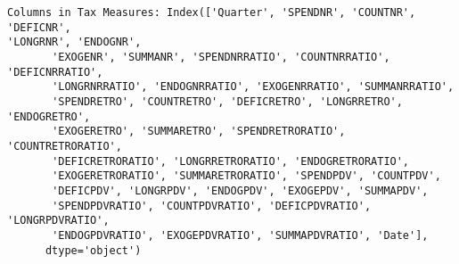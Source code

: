\documentclass[11pt]{article}
\begin{document}
    \begin{Verbatim}[commandchars=\\\{\}]
Columns in Tax Measures: Index(['Quarter', 'SPENDNR', 'COUNTNR', 'DEFICNR',
'LONGRNR', 'ENDOGNR',
       'EXOGENR', 'SUMMANR', 'SPENDNRRATIO', 'COUNTNRRATIO', 'DEFICNRRATIO',
       'LONGRNRRATIO', 'ENDOGNRRATIO', 'EXOGENRRATIO', 'SUMMANRRATIO',
       'SPENDRETRO', 'COUNTRETRO', 'DEFICRETRO', 'LONGRRETRO', 'ENDOGRETRO',
       'EXOGERETRO', 'SUMMARETRO', 'SPENDRETRORATIO', 'COUNTRETRORATIO',
       'DEFICRETRORATIO', 'LONGRRETRORATIO', 'ENDOGRETRORATIO',
       'EXOGERETRORATIO', 'SUMMARETRORATIO', 'SPENDPDV', 'COUNTPDV',
       'DEFICPDV', 'LONGRPDV', 'ENDOGPDV', 'EXOGEPDV', 'SUMMAPDV',
       'SPENDPDVRATIO', 'COUNTPDVRATIO', 'DEFICPDVRATIO', 'LONGRPDVRATIO',
       'ENDOGPDVRATIO', 'EXOGEPDVRATIO', 'SUMMAPDVRATIO', 'Date'],
      dtype='object')
    \end{Verbatim}

    \begin{center}
    \end{center}
    { \hspace*{\fill} \\}
    
\end{document}
